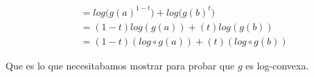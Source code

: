 \begin{align}
                                         &=      log\bigg( 
                                                        g(a)^{1-t} 
                                                \bigg)
                                                        + 
                                                log\bigg(
                                                        g(b)^{t}
                                                \bigg)                                                                              \\
                                         &=      (1-t)log(g(a))+(t)log(g(b))                                                        \\
                                         &=      (1-t)(log \circ g (a))+(t)(log \circ g (b))                                        
    \end{align}
    
    Que es lo que necesitabamos mostrar para probar que $g$ es log-convexa.